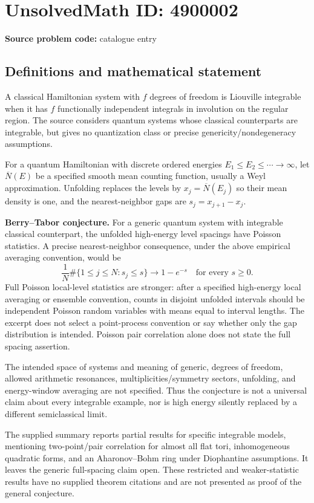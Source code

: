 \documentclass[11pt]{article}
\begin{document}
\section*{UnsolvedMath ID: 4900002}
\textbf{Source problem code:} catalogue entry
\subsection{Definitions and mathematical statement}
A classical Hamiltonian system with $f$ degrees of freedom is Liouville integrable when it has $f$ functionally independent integrals in involution on the regular region. The source considers quantum systems whose classical counterparts are integrable, but gives no quantization class or precise genericity/nondegeneracy assumptions.

For a quantum Hamiltonian with discrete ordered energies $E_1\leq E_2\leq\cdots\to\infty$, let $\overline N(E)$ be a specified smooth mean counting function, usually a Weyl approximation. Unfolding replaces the levels by $x_j=\overline N(E_j)$ so their mean density is one, and the nearest-neighbor gaps are $s_j=x_{j+1}-x_j$.

\textbf{Berry--Tabor conjecture.} For a generic quantum system with integrable classical counterpart, the unfolded high-energy level spacings have Poisson statistics. A precise nearest-neighbor consequence, under the above empirical averaging convention, would be
\[
 \frac1N\#\{1\leq j\leq N:s_j\leq s\}\longrightarrow1-e^{-s}
 \quad\text{for every }s\geq0.
\]
Full Poisson local-level statistics are stronger: after a specified high-energy local averaging or ensemble convention, counts in disjoint unfolded intervals should be independent Poisson random variables with means equal to interval lengths. The excerpt does not select a point-process convention or say whether only the gap distribution is intended. Poisson pair correlation alone does not state the full spacing assertion.

The intended space of systems and meaning of generic, degrees of freedom, allowed arithmetic resonances, multiplicities/symmetry sectors, unfolding, and energy-window averaging are not specified. Thus the conjecture is not a universal claim about every integrable example, nor is high energy silently replaced by a different semiclassical limit.

The supplied summary reports partial results for specific integrable models, mentioning two-point/pair correlation for almost all flat tori, inhomogeneous quadratic forms, and an Aharonov--Bohm ring under Diophantine assumptions. It leaves the generic full-spacing claim open. These restricted and weaker-statistic results have no supplied theorem citations and are not presented as proof of the general conjecture.
\end{document}
